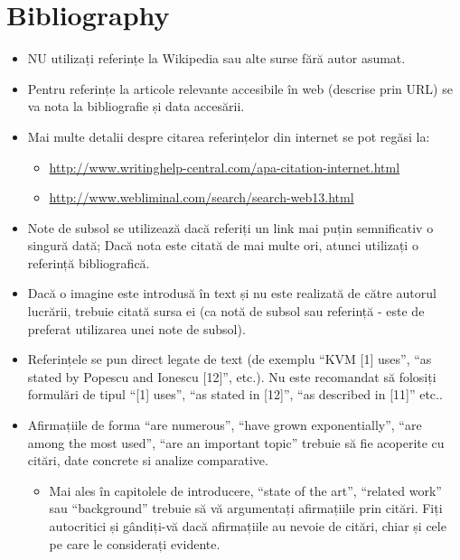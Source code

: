 \documentclass[12pt,a4paper]{report}
\begin{document}
\chapter*{Bibliography}  
% 
% 

\begin{itemize}
	\item 	NU utilizați referințe la Wikipedia sau alte surse fără autor asumat.
	\item 	Pentru referințe la articole relevante accesibile în web (descrise prin URL) se va nota la bibliografie și data accesării.
	\item 	Mai multe detalii despre citarea referințelor din internet se pot regăsi la:
	\begin{itemize}
		\item	\url{http://www.writinghelp-central.com/apa-citation-internet.html}
		\item	\url{http://www.webliminal.com/search/search-web13.html}
	\end{itemize}
	\item 	Note de subsol se utilizează dacă referiți un link mai puțin semnificativ o singură dată; Dacă nota este citată de mai multe ori, atunci utilizați o referință bibliografică.
	\item 	Dacă o imagine este introdusă în text și nu este realizată de către autorul lucrării, trebuie citată sursa ei (ca notă de subsol sau referință - este de preferat utilizarea unei note de subsol).
	\item 	Referințele se pun direct legate de text (de exemplu ``KVM [1] uses'', ``as stated by Popescu and Ionescu [12]'', etc.). Nu este recomandat să folosiți formulări de tipul ``[1] uses'', ``as stated in [12]'', ``as described in [11]'' etc..
	\item 	Afirmațiile de forma ``are numerous'', ``have grown exponentially'', ``are among the most used'', ``are an important topic'' trebuie să fie acoperite cu citări, date concrete si analize comparative.
	\begin{itemize}
		\item	Mai ales în capitolele de introducere, ``state of the art'', ``related work'' sau ``background'' trebuie să vă argumentați afirmațiile prin citări. Fiți autocritici și gândiți-vă dacă afirmațiile au nevoie de citări, chiar și cele pe care le considerați evidente.

\end{itemize}
\end{itemize}
\end{document}
